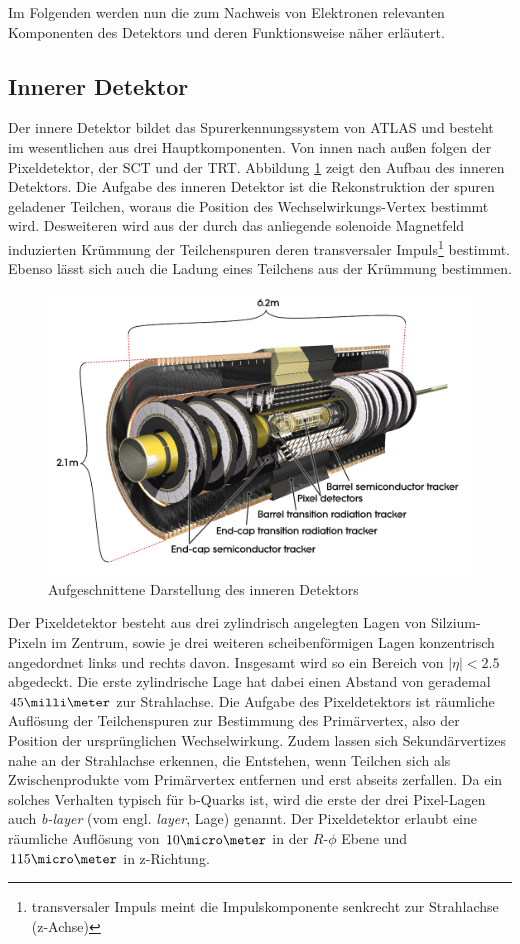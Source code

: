 Im Folgenden werden nun die zum Nachweis von Elektronen relevanten Komponenten
des Detektors und deren Funktionsweise näher erläutert.



\subsection{Innerer Detektor}
\label{inner_detector}

Der innere Detektor bildet das Spurerkennungssystem von ATLAS und besteht im
wesentlichen aus drei Hauptkomponenten. Von innen nach außen folgen der
Pixeldetektor, der \acf{SCT} und der \acf{TRT}. Abbildung
\ref{fig:inner_detector} zeigt den Aufbau des inneren Detektors. Die Aufgabe
des inneren Detektor ist die Rekonstruktion der spuren geladener Teilchen,
woraus die Position des Wechselwirkungs-Vertex bestimmt wird. Desweiteren wird
aus der durch das anliegende solenoide Magnetfeld induzierten Krümmung der
Teilchenspuren deren transversaler Impuls\footnote{transversaler Impuls meint
die Impulskomponente senkrecht zur Strahlachse (z-Achse)} bestimmt. Ebenso
lässt sich auch die Ladung eines Teilchens aus der Krümmung bestimmen.

\begin{figure}
    \centering
    \includegraphics[width=.8\textwidth]{img/inner_detector}
    \caption[Darstellung des inneren Detektors]
        {Aufgeschnittene Darstellung des inneren Detektors}
    \label{fig:inner_detector}
\end{figure}

Der Pixeldetektor besteht aus drei zylindrisch angelegten Lagen von
Silzium-Pixeln im Zentrum, sowie je drei weiteren scheibenförmigen Lagen
konzentrisch angedordnet links und rechts davon. Insgesamt wird so ein Bereich
von $|\eta| < 2.5$ abgedeckt. Die erste zylindrische Lage hat dabei einen
Abstand von gerademal $45\milli\meter$ zur Strahlachse. Die Aufgabe des
Pixeldetektors ist räumliche Auflösung der Teilchenspuren zur Bestimmung des
Primärvertex, also der Position der ursprünglichen Wechselwirkung. Zudem lassen
sich Sekundärvertizes nahe an der Strahlachse erkennen, die Entstehen, wenn
Teilchen sich als Zwischenprodukte vom Primärvertex entfernen und erst abseits
zerfallen. Da ein solches Verhalten typisch für b-Quarks ist, wird die erste
der drei Pixel-Lagen auch \textit{b-layer} (vom engl. \textit{layer}, Lage)
genannt. Der Pixeldetektor erlaubt eine räumliche Auflösung von
$10\micro\meter$ in der $R$-$\phi$ Ebene und $115\micro\meter$ in z-Richtung.

